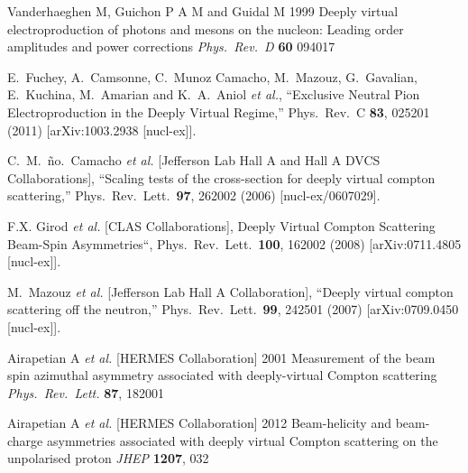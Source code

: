   Vanderhaeghen M, Guichon P A M and Guidal M 1999
  Deeply virtual electroproduction of photons and mesons on the nucleon: Leading order amplitudes and power corrections 
  {\it Phys.\ Rev.\ D} {\bf 60} 094017 

  E.~Fuchey, A.~Camsonne, C.~Munoz Camacho, M.~Mazouz, G.~Gavalian, E.~Kuchina, M.~Amarian and K.~A.~Aniol {\it et al.},
  ``Exclusive Neutral Pion Electroproduction in the Deeply Virtual Regime,''
  Phys.\ Rev.\ C {\bf 83}, 025201 (2011)
  [arXiv:1003.2938 [nucl-ex]].

  C.~M.~ño.~Camacho {\it et al.}  [Jefferson Lab Hall A and Hall A DVCS Collaborations],
  ``Scaling tests of the cross-section for deeply virtual compton scattering,''
  Phys.\ Rev.\ Lett.\  {\bf 97}, 262002 (2006)
  [nucl-ex/0607029].

  F.X. Girod {\it et al.}  [CLAS Collaborations],
  Deeply Virtual Compton Scattering Beam-Spin Asymmetries``,
  Phys.\ Rev.\ Lett.\ {\bf100}, 162002 (2008)
  [arXiv:0711.4805 [nucl-ex]].

  M.~Mazouz {\it et al.}  [Jefferson Lab Hall A Collaboration],
  ``Deeply virtual compton scattering off the neutron,''
  Phys.\ Rev.\ Lett.\  {\bf 99}, 242501 (2007)
  [arXiv:0709.0450 [nucl-ex]].

  Airapetian A {\it et al.}  [HERMES Collaboration] 2001
  Measurement of the beam spin azimuthal asymmetry associated with
  deeply-virtual Compton scattering
  {\it Phys.\ Rev.\ Lett.}  {\bf 87}, 182001

  Airapetian A {\it et al.}  [HERMES Collaboration] 2012
  Beam-helicity and beam-charge asymmetries associated with deeply virtual Compton scattering on the unpolarised proton
  {\it JHEP} {\bf 1207}, 032

